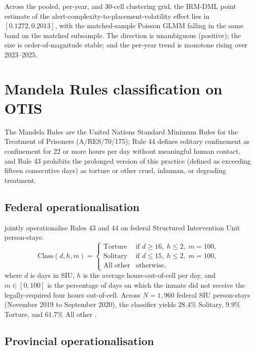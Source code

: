\documentclass[article,shortnames,nojss]{jss}
\newcommand{\OTIS}{\textsf{OTIS}}
\begin{document}
Across the pooled, per-year, and 30-cell clustering grid, the IRM-DML
point estimate of the alert-complexity-to-placement-volatility
effect lies in $[0.1272, 0.2013]$, with the matched-sample Poisson
GLMM falling in the same band on the matched subsample. The
direction is unambiguous (positive); the size is order-of-magnitude
stable; and the per-year trend is monotone rising over 2023--2025.

\section[Mandela Rules classification on OTIS]{Mandela Rules classification on \OTIS{}}
\label{sec:mandela}

The Mandela Rules \citep{MandelaRules2015} are the United Nations
Standard Minimum Rules for the Treatment of Prisoners (A/RES/70/175);
Rule 44 defines solitary confinement as confinement for 22 or more
hours per day without meaningful human contact, and Rule 43 prohibits
the prolonged version of this practice (defined as exceeding fifteen
consecutive days) as torture or other cruel, inhuman, or degrading
treatment.

\subsection{Federal operationalisation}
\label{sec:mandela-federal}

\citet{SprottDoob2023} jointly operationalise Rules 43 and 44 on
federal Structured Intervention Unit person-stays:
\begin{equation}
\label{eq:federal-mandela}
  \mathrm{Class}(d, h, m) = \begin{cases}
    \mathrm{Torture}    & \text{if } d \ge 16,\; h \le 2,\; m = 100, \\
    \mathrm{Solitary}   & \text{if } d \le 15,\; h \le 2,\; m = 100, \\
    \mathrm{All\;other} & \text{otherwise},
  \end{cases}
\end{equation}
where $d$ is days in SIU, $h$ is the average hours-out-of-cell per
day, and $m \in [0, 100]$ is the percentage of days on which the
inmate did not receive the legally-required four hours out-of-cell.
Across $N = 1{,}960$ federal SIU person-stays (November 2019 to
September 2020), the classifier yields $28.4\%$ Solitary, $9.9\%$
Torture, and $61.7\%$ All other \citep{SprottDoob2023}.

\subsection{Provincial operationalisation}
\label{sec:mandela-provincial}
\end{document}
